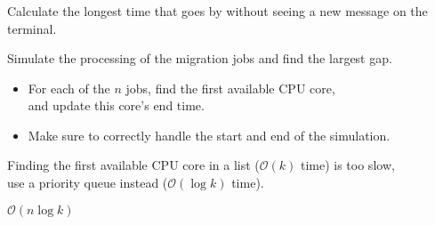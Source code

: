 \begin{frame}
    \frametitle{\problemtitle}
    \begin{description}
        \item<+->[Problem:] Calculate the longest time that goes by without seeing a new message on the terminal.
        \item<+->[Solution:] Simulate the processing of the migration jobs and find the largest gap.
        \begin{itemize}
            \item For each of the $n$ jobs, find the first available CPU core, \\ and update this core's end time.
            \item Make sure to correctly handle the start and end of the simulation.
        \end{itemize}
        \item<+->[Pitfall:] Finding the first available CPU core in a list ($\mathcal O(k)$ time) is too slow, \\
            use a priority queue instead ($\mathcal O(\log k)$ time).
        \item<+->[Run time:] $\mathcal O(n \log k)$
    \end{description}
    \solvestats
\end{frame}
